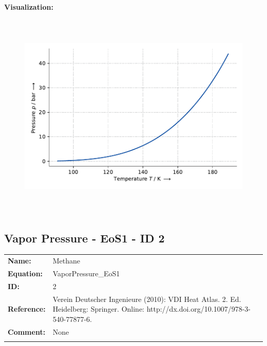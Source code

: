 \textbf{Visualization:}
%
\begin{figure}[!htp]
{\noindent\includegraphics[height=10cm, keepaspectratio]{figs/ref/ref_Methane_VaporPressure_EoS1_1.pdf}}
\end{figure}
%

\FloatBarrier
\newpage
\subsection{Vapor Pressure - EoS1 - ID 2}
%
\begin{tabular}[l]{|lp{11.5cm}|}
\hline
\addlinespace

\textbf{Name:} & Methane \\
\textbf{Equation:} & VaporPressure\_EoS1 \\
\textbf{ID:} & 2 \\
\textbf{Reference:} & Verein Deutscher Ingenieure (2010): VDI Heat Atlas. 2. Ed. Heidelberg: Springer. Online: http://dx.doi.org/10.1007/978-3-540-77877-6. \\
\textbf{Comment:} & None \\

\addlinespace
\hline
\end{tabular}
\newline

